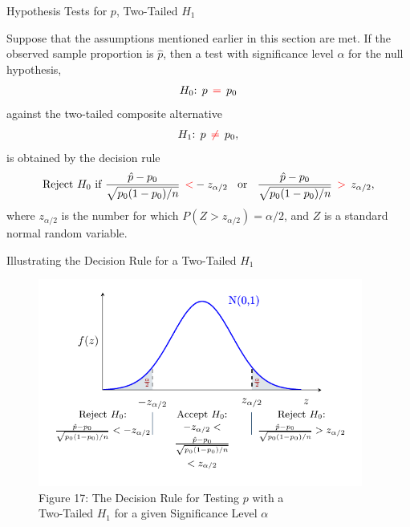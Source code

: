 \documentclass[pdf]{beamer}
\theoremstyle{remark}
\theoremstyle{definition}
\begin{document}
\begin{frame}[t,label=pTT]{Hypothesis Tests for $p$, Two-Tailed $H_1$}
\small
\begin{tcolorbox}[colback=white!5,colframe=franklinblue]%
Suppose that the assumptions mentioned earlier in this section are met. If the observed sample proportion is $\hat{p}$, then a test with significance level $\alpha$ for the null hypothesis, 
\vspace{-1.0ex}
\begin{align*} 
H_0\text{: }  p \;\, \textcolor{red}{=} \;\, p_0  
\end{align*} 
\vspace{-1.0ex}
against the two-tailed composite alternative 
\vspace{0.0ex}
\begin{align*} 
H_1\text{: }  p \;\, \textcolor{red}{\neq} \;\, p_0, 
\end{align*} 
\vspace{-1.0ex}
is obtained by the decision rule 
\vspace{0.0ex}
\begin{equation} 
\text{Reject } H_0 \text{ if } \frac{\hat{p} - p_0}{\sqrt{p_0(1-p_0)/ n}} \;\, \textcolor{red}{<} -z_{\alpha/2} \;\; \text{ or } \;\;
\frac{\hat{p} - p_0}{\sqrt{p_0(1-p_0)/ n}} \;\, \textcolor{red}{>} \;\, z_{\alpha/2},
\end{equation} 
where $z_{\alpha/2}$ is the number for which $P(Z > z_{\alpha/2}) = \alpha/2$, and $Z$ is a standard normal random variable. 
\end{tcolorbox}
\end{frame}

\begin{frame}[t]{Illustrating the Decision Rule for a Two-Tailed $H_1$ }
\begin{figure}[htbp]
    \centering
    \captionsetup{justification=centering}
    \includegraphics[clip, trim=0.5cm 0.5cm 0.0cm 0cm, width=0.95\textwidth]{Hypothesis_Testing_Module_9_pZ3.pdf}  
    \caption{Figure {\color{franklinblue} 17}: The Decision Rule for Testing $p$ with a \\ Two-Tailed $H_1$ for a given Significance Level $\alpha$}
    \label{fig:gauss9}
\end{figure}
\end{frame}
\end{document}
